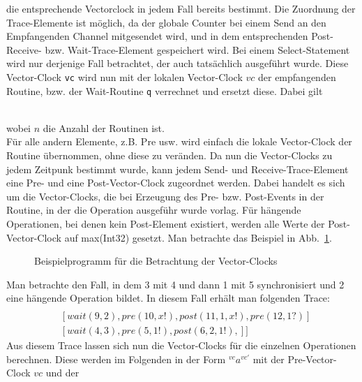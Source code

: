die entsprechende Vectorclock in jedem Fall bereits bestimmt. Die Zuordnung der Trace-Elemente 
ist möglich, da der globale Counter bei einem Send an den Empfangenden Channel mitgesendet 
wird, und in dem entsprechenden Post-Receive- bzw. Wait-Trace-Element gespeichert wird.
Bei einem Select-Statement wird nur derjenige Fall betrachtet, der auch tatsächlich ausgeführt wurde.
Diese Vector-Clock \texttt{vc}
wird nun mit der lokalen Vector-Clock $vc$ der empfangenden Routine, bzw. der Wait-Routine 
\texttt{q} verrechnet und ersetzt diese. Dabei gilt\\
\begin{figure}[h]
  \centering
  
\end{figure}\\
wobei $n$ die Anzahl der Routinen ist.\\
Für alle andern Elemente, z.B. Pre usw. wird einfach die lokale Vector-Clock der Routine übernommen, 
ohne diese zu veränden. Da nun die Vector-Clocks zu jedem Zeitpunk bestimmt wurde, kann jedem 
Send- und Receive-Trace-Element eine Pre- und eine Post-Vector-Clock zugeordnet werden. 
Dabei handelt es sich um die Vector-Clocks, die bei Erzeugung des Pre- bzw. Post-Events in 
der Routine, in der die Operation ausgeführ wurde vorlag. Für hängende Operationen, 
bei denen kein Post-Element existiert, werden alle Werte der Post-Vector-Clock auf 
max(Int32) gesetzt.
Man betrachte das Beispiel in Abb.~\ref{Chap:Analyze-Sec:Channel-SubSec:Dangling-Fig:PorgVC}.
\begin{figure}[h!]
  \centering
  
  \caption{Beispielprogramm für die Betrachtung der Vector-Clocks}
  \label{Chap:Analyze-Sec:Channel-SubSec:Dangling-Fig:PorgVC}
\end{figure}
Man betrachte den Fall, in dem 3 mit 4 und dann 1 mit 5 synchronisiert und 2 eine hängende Operation bildet.
In diesem Fall erhält man folgenden Trace:
\begin{align*}
  [&[signal(1, 2), signale(2, 3), pre(1, x?), post(7, 1, x?, 6), pre(8, x?), post(13, 1, x?, 11)]\\
  &[wait(9, 2), pre(10, x!), post(11, 1, x!), pre(12, 1?)]\\
  &[wait(4, 3), pre(5, 1!), post(6, 2, 1!),]
  ]
\end{align*}
Aus diesem Trace lassen sich nun die Vector-Clocks für die einzelnen Operationen berechnen.
Diese werden im Folgenden in der Form $^{vc}a^{vc'}$ mit der Pre-Vector-Clock $vc$ und der 
